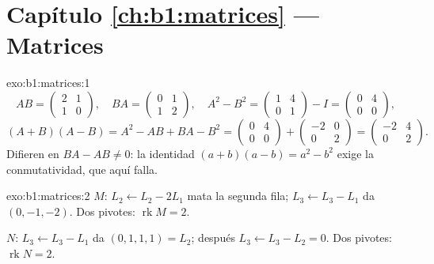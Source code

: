 \section*{Capítulo \ref{ch:b1:matrices} --- Matrices}

\begin{solution}{exo:b1:matrices:1}
\[
AB = \begin{pmatrix} 2 & 1\\ 1 & 0\end{pmatrix},
\quad
BA = \begin{pmatrix} 0 & 1\\ 1 & 2\end{pmatrix},
\quad
A^2 - B^2 = \begin{pmatrix} 1 & 4\\ 0 & 1\end{pmatrix} - I
= \begin{pmatrix} 0 & 4\\ 0 & 0\end{pmatrix},
\]
\[
(A+B)(A-B) = A^2 - AB + BA - B^2
= \begin{pmatrix} 0 & 4\\ 0 & 0\end{pmatrix} +
\begin{pmatrix} -2 & 0\\ 0 & 2 \end{pmatrix}
= \begin{pmatrix} -2 & 4\\ 0 & 2\end{pmatrix}.
\]
Difieren en $BA - AB \neq 0$: la identidad
$(a+b)(a-b) = a^2 - b^2$ exige la conmutatividad, que aquí falla.
\end{solution}

\begin{solution}{exo:b1:matrices:2}
$M$: $L_2 \leftarrow L_2 - 2L_1$ mata la segunda fila;
$L_3 \leftarrow L_3 - L_1$ da $(0, -1, -2)$. Dos pivotes:
$\operatorname{rk} M = 2$.

$N$: $L_3 \leftarrow L_3 - L_1$ da $(0,1,1,1) = L_2$; después
$L_3 \leftarrow L_3 - L_2 = 0$. Dos pivotes: $\operatorname{rk} N = 2$.
\end{solution}

